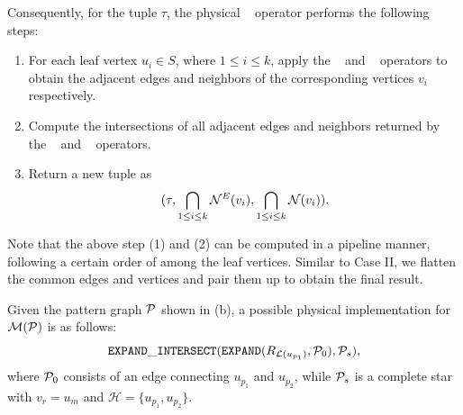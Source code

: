 Consequently, for the tuple $\tau$, the physical \expandintersect~ operator performs the following steps:

\begin{enumerate}
\item For each leaf vertex $u_i \in S$, where $1 \leq i \leq k$, apply the \expandedge~ and \getvertex~ operators to obtain the adjacent edges and neighbors of the corresponding vertices $v_i$ respectively.
\item Compute the intersections of all adjacent edges and neighbors returned by the \expandedge~ and \getvertex~ operators.
\item Return a new tuple as
\[
    (\tau, \bigcap_{1 \leq i \leq k}{\mathcal{N}}^E(v_i), \bigcap_{1 \leq i \leq k}{\mathcal{N}}(v_i)).
\]
\end{enumerate}

Note that the above step (1) and (2) can be computed in a pipeline manner, following a certain order of among the leaf vertices.
Similar to Case II, we flatten the common edges and vertices and pair them up to obtain the final result.

\begin{example}
    Given the pattern graph $\mathcal{P}$ shown in (b), a possible physical implementation for $\mathcal{M}(\mathcal{P})$ is as follows:
    \begin{equation*}
        \texttt{EXPAND}\_\texttt{INTERSECT}({\texttt{EXPAND}}({R_{\mathcal{L}(u_{p_1})}}, \mathcal{P}_{0}), \mathcal{P}_{s}),
    \end{equation*}
    where $\mathcal{P}_{0}$ consists of an edge connecting $u_{p_1}$ and $u_{p_2}$, while $\mathcal{P}_{s}$ is a complete star with $v_r = u_m$ and $\mathcal{H} = \{u_{p_1}, u_{p_2}\}$.
\end{example}
